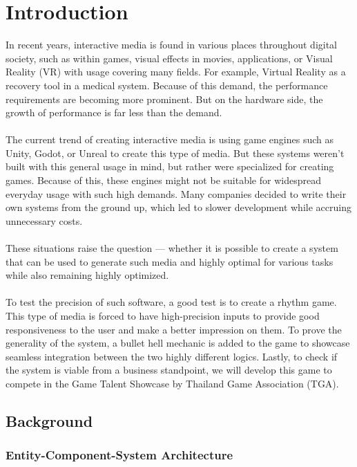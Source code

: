 \section{Introduction}
\label{sec:introduction}
In recent years, interactive media is found in various places throughout digital society,
such as within games, visual effects in movies, applications, or Visual Reality (VR)
with usage covering many fields.
For example, Virtual Reality as a recovery tool in a medical system.
Because of this demand, the performance requirements are becoming more prominent.
But on the hardware side, the growth of performance
is far less than the demand.
\\\\
The current trend of creating interactive media is using game engines such as Unity, Godot, or
Unreal to create this type of media.
But these systems weren't built with this general usage in mind, but rather were specialized for creating games.
Because of this, these engines might not be suitable for widespread everyday usage with such high demands.
Many companies decided to write their own systems from the ground up, which led to slower development while accruing
unnecessary costs.
\\\\
These situations raise the question — whether it is possible to create a system that can be used to generate such media
and highly optimal for various tasks while also remaining highly optimized.
\\\\
To test the precision of such software, a good test is to create a rhythm game.
This type of media is forced to have high-precision inputs to provide good responsiveness to
the user and make a better impression on them.
To prove the generality of the system, a bullet hell mechanic is added to the game to showcase seamless
integration between the two highly different logics.
Lastly, to check if the system is viable from a business standpoint, we will develop this game
to compete in the Game Talent Showcase by Thailand Game Association (TGA).

\subsection{Background}
\label{subsec:background}

\subsubsection*{Entity-Component-System Architecture}

